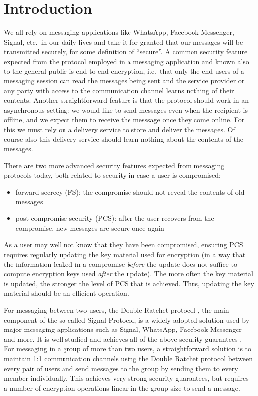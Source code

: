 \section{Introduction}

We all rely on messaging applications like WhatsApp, Facebook Messenger, Signal, etc.\ in our daily lives and take it for granted that our messages will be transmitted securely, for some definition of ``secure''. A common security feature expected from the protocol employed in a messaging application and known also to the general public is end-to-end encryption, i.e.\ that only the end users of a messaging session can read the messages being sent and the service provider or any party with access to the communication channel learns nothing of their contents. Another straightforward feature is that the protocol should work in an asynchronous setting: we would like to send messages even when the recipient is offline, and we expect them to receive the messsage once they come online. For this we must rely on a delivery service to store and deliver the messages. Of course also this delivery service should learn nothing about the contents of the messages.

There are two more advanced security features expected from messaging protocols today, both related to security in case a user is compromised:
\begin{itemize}
	\item forward secrecy (FS): the compromise should not reveal the contents of old messages
	\item post-compromise security (PCS): after the user recovers from the compromise, new messages are secure once again
\end{itemize}
As a user may well not know that they have been compromised, ensuring PCS requires regularly updating the key material used for encryption (in a way that the information leaked in a compromise \emph{before} the update does not suffice to compute encryption keys used \emph{after} the update). The more often the key material is updated, the stronger the level of PCS that is achieved. Thus, updating the key material should be an efficient operation.

For messaging between two users, the Double Ratchet protocol \cite{double-ratchet}, the main component of the so-called Signal Protocol, is a widely adopted solution used by major messaging applications such as Signal, WhatsApp, Facebook Messenger and more. It is well studied and achieves all of the above security guarantees \cite{double-ratchet-analysis}. For messaging in a group of more than two users, a straightforward solution is to maintain 1:1 communication channels using the Double Ratchet protocol between every pair of users and send messages to the group by sending them to every member individually. This achieves very strong security guarantees, but requires a number of encryption operations linear in the group size to send a message.

